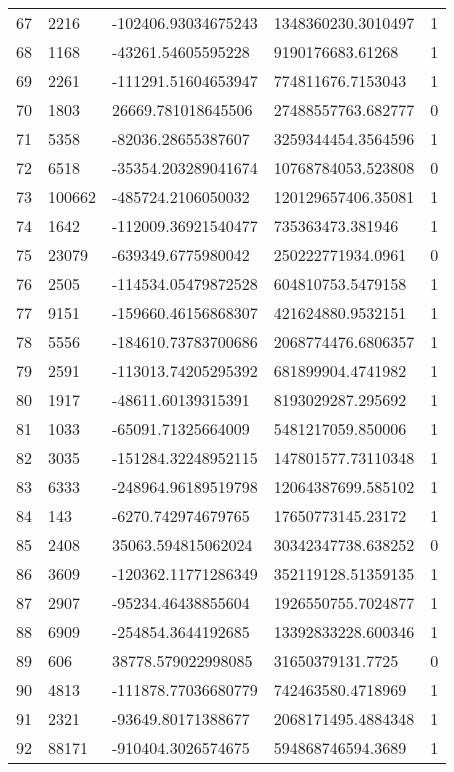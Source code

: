 \begin{longtable}{lllll}
    67 & 2216 & -102406.93034675243 & 1348360230.3010497 & 1 \\
    68 & 1168 & -43261.54605595228 & 9190176683.61268 & 1 \\
    69 & 2261 & -111291.51604653947 & 774811676.7153043 & 1 \\
    70 & 1803 & 26669.781018645506 & 27488557763.682777 & 0 \\
    71 & 5358 & -82036.28655387607 & 3259344454.3564596 & 1 \\
    72 & 6518 & -35354.203289041674 & 10768784053.523808 & 0 \\
    73 & 100662 & -485724.2106050032 & 120129657406.35081 & 1 \\
    74 & 1642 & -112009.36921540477 & 735363473.381946 & 1 \\
    75 & 23079 & -639349.6775980042 & 250222771934.0961 & 0 \\
    76 & 2505 & -114534.05479872528 & 604810753.5479158 & 1 \\
    77 & 9151 & -159660.46156868307 & 421624880.9532151 & 1 \\
    78 & 5556 & -184610.73783700686 & 2068774476.6806357 & 1 \\
    79 & 2591 & -113013.74205295392 & 681899904.4741982 & 1 \\
    80 & 1917 & -48611.60139315391 & 8193029287.295692 & 1 \\
    81 & 1033 & -65091.71325664009 & 5481217059.850006 & 1 \\
    82 & 3035 & -151284.32248952115 & 147801577.73110348 & 1 \\
    83 & 6333 & -248964.96189519798 & 12064387699.585102 & 1 \\
    84 & 143 & -6270.742974679765 & 17650773145.23172 & 1 \\
    85 & 2408 & 35063.594815062024 & 30342347738.638252 & 0 \\
    86 & 3609 & -120362.11771286349 & 352119128.51359135 & 1 \\
    87 & 2907 & -95234.46438855604 & 1926550755.7024877 & 1 \\
    88 & 6909 & -254854.3644192685 & 13392833228.600346 & 1 \\
    89 & 606 & 38778.579022998085 & 31650379131.7725 & 0 \\
    90 & 4813 & -111878.77036680779 & 742463580.4718969 & 1 \\
    91 & 2321 & -93649.80171388677 & 2068171495.4884348 & 1 \\
    92 & 88171 & -910404.3026574675 & 594868746594.3689 & 1 \\

\end{longtable}
